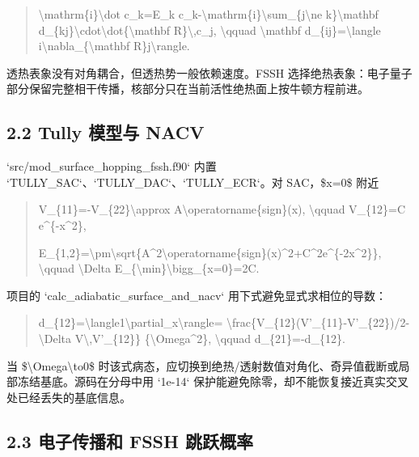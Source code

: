\documentclass[UTF8,openany,11pt,fontset=fandol]{ctexbook}
\begin{document}
\begin{quote}
\textbackslash mathrm\{i\}\textbackslash dot c\_k=E\_k
c\_k-\textbackslash mathrm\{i\}\textbackslash sum\_\{j\textbackslash ne
k\}\textbackslash mathbf
d\_\{kj\}\textbackslash cdot\textbackslash dot\{\textbackslash mathbf
R\}\textbackslash,c\_j, \textbackslash qquad \textbackslash mathbf
d\_\{ij\}=\textbackslash langle
i\textbar\textbackslash nabla\_\{\textbackslash mathbf
R\}\textbar j\textbackslash rangle.
\end{quote}

透热表象没有对角耦合，但透热势一般依赖速度。FSSH
选择绝热表象：电子量子部分保留完整相干传播，核部分只在当前活性绝热面上按牛顿方程前进。

\subsection{\texorpdfstring{\textbf{2.2 Tully 模型与
NACV}}{2.2 Tully 模型与 NACV}}\label{tully-ux6a21ux578bux4e0e-nacv}

`src/mod\_surface\_hopping\_fssh.f90` 内置
`TULLY\_SAC`、`TULLY\_DAC`、`TULLY\_ECR`。对 SAC，\$x=0\$ 附近

\begin{quote}
V\_\{11\}=-V\_\{22\}\textbackslash approx
A\textbackslash operatorname\{sign\}(x), \textbackslash qquad
V\_\{12\}=C e\^{}\{-x\^{}2\},

E\_\{1,2\}=\textbackslash pm\textbackslash sqrt\{A\^{}2\textbackslash operatorname\{sign\}(x)\^{}2+C\^{}2e\^{}\{-2x\^{}2\}\},
\textbackslash qquad \textbackslash Delta
E\_\{\textbackslash min\}\textbackslash bigg\textbar\_\{x=0\}=2C.
\end{quote}

项目的 `calc\_adiabatic\_surface\_and\_nacv`
用下式避免显式求相位的导数：

\begin{quote}
d\_\{12\}=\textbackslash langle1\textbar\textbackslash partial\_x\textbackslash rangle=
\textbackslash frac\{V\_\{12\}(V'\_\{11\}-V'\_\{22\})/2-\textbackslash Delta
V\textbackslash,V'\_\{12\}\} \{\textbackslash Omega\^{}2\},
\textbackslash qquad d\_\{21\}=-d\_\{12\}.
\end{quote}

当 \$\textbackslash Omega\textbackslash to0\$
时该式病态，应切换到绝热/透射数值对角化、奇异值截断或局部冻结基底。源码在分母中用
`1e-14` 保护能避免除零，却不能恢复接近真实交叉处已经丢失的基底信息。

\subsection{\texorpdfstring{\textbf{2.3 电子传播和 FSSH
跳跃概率}}{2.3 电子传播和 FSSH 跳跃概率}}\label{ux7535ux5b50ux4f20ux64adux548c-fssh-ux8df3ux8dc3ux6982ux7387}
\end{document}
